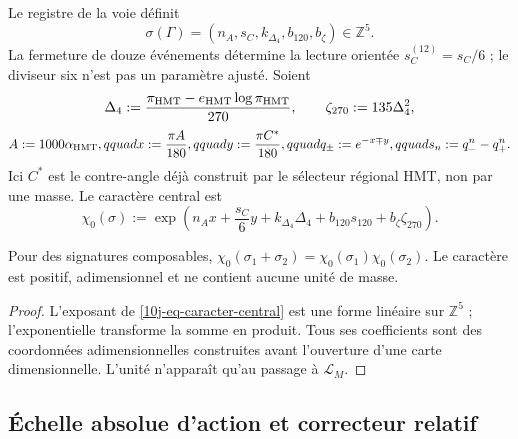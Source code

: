 \begin{definition}
\label{10j-def-firma-caracter}
Le registre de la voie définit
\begin{equation}
 \sigma(\Gamma)=
 (n_A,s_C,k_{\Delta_4},b_{120},b_\zeta)\in\mathbb Z^5.
 \label{10j-eq-firma-z5}
\end{equation}
La fermeture de douze événements détermine la lecture orientée \(s_C^{(12)}=s_C/6\) ; le diviseur six n'est pas un paramètre ajusté. Soient
\begin{equation}
 \Delta_4:=
 \frac{\pi_{\rm HMT}-e_{\rm HMT}\log\pi_{\rm HMT}}{270},
 \qquad \zeta_{270}:=135\Delta_4^2,
 \label{10j-eq-delta-zeta}
\end{equation}
\begin{equation}
 A:=1000\alpha_{\rm HMT},qquad
 x:=\frac{\pi A}{180},qquad
 y:=\frac{\pi C^*}{180},qquad
 q_\pm:=e^{-x\mp y},qquad
 s_n:=q_-^n-q_+^n .
 \label{10j-eq-canales}
\end{equation}
Ici \(C^*\) est le contre-angle déjà construit par le sélecteur régional HMT, non par une masse. Le caractère central est
\begin{equation}
 \chi_0(\sigma):=
 \exp\!\left(
 n_Ax+\frac{s_C}{6}y+k_{\Delta_4}\Delta_4
 +b_{120}s_{120}+b_\zeta\zeta_{270}
 \right).
 \label{10j-eq-caracter-central}
\end{equation}
\end{definition}

\begin{lemma}
\label{10j-lem-caracter}
Pour des signatures composables, \(
 \chi_0(\sigma_1+\sigma_2)=\chi_0(\sigma_1)\chi_0(\sigma_2)
\). Le caractère est positif, adimensionnel et ne contient aucune unité de masse.
\end{lemma}

\begin{proof}
L'exposant de \eqref{10j-eq-caracter-central} est une forme linéaire sur \(\mathbb Z^5\) ; l'exponentielle transforme la somme en produit. Tous ses coefficients sont des coordonnées adimensionnelles construites avant l'ouverture d'une carte dimensionnelle. L'unité n'apparaît qu'au passage à \(\mathcal L_M\).
\end{proof}

\subsection{Échelle absolue d'action et correcteur relatif}

